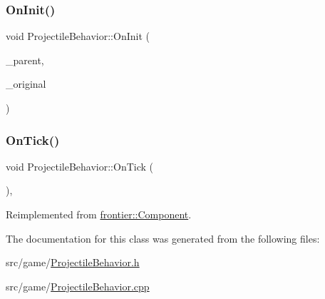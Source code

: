 \mbox{\label{class_projectile_behavior_a5e356eb4a161e7784c50b14ba39d98d1}} 
\subsubsection{\texorpdfstring{On\+Init()}{OnInit()}\hspace{0.1cm}{\footnotesize\ttfamily [2/2]}}
{\footnotesize\ttfamily void Projectile\+Behavior\+::\+On\+Init (\begin{DoxyParamCaption}\item[{std\+::weak\+\_\+ptr$<$ \hyperlink{classfrontier_1_1_entity}{frontier\+::\+Entity} $>$}]{\+\_\+parent,  }\item[{std\+::weak\+\_\+ptr$<$ \hyperlink{class_projectile_behavior}{Projectile\+Behavior} $>$}]{\+\_\+original }\end{DoxyParamCaption})}

\mbox{\label{class_projectile_behavior_a7756651ba998e7f3c0abcafcf25796ae}} 
\subsubsection{\texorpdfstring{On\+Tick()}{OnTick()}}
{\footnotesize\ttfamily void Projectile\+Behavior\+::\+On\+Tick (\begin{DoxyParamCaption}{ }\end{DoxyParamCaption})\hspace{0.3cm}{\ttfamily [override]}, {\ttfamily [virtual]}}



Reimplemented from \hyperlink{classfrontier_1_1_component_ab920f9bc07ce051ebb5559c5a66508d1}{frontier\+::\+Component}.



The documentation for this class was generated from the following files\+:\begin{DoxyCompactItemize}
\item 
src/game/\hyperlink{_projectile_behavior_8h}{Projectile\+Behavior.\+h}\item 
src/game/\hyperlink{_projectile_behavior_8cpp}{Projectile\+Behavior.\+cpp}\end{DoxyCompactItemize}
